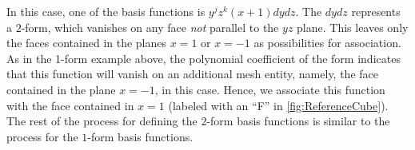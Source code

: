 \documentclass[format=acmsmall,screen,timestamp=false,a4paper]{acmart}
\newcommand\justin[1]{\textbf{\textcolor[rgb]{0,1,0.5}{[Justin: #1]}}}
\newcommand\lm[1]{\textbf{\textcolor[rgb]{1,0,0.5}{[Lawrence: #1]}}}
\begin{document}
\noindent In this case, one of the basis functions is $y^jz^k(x+1)dydz$.  The $dydz$ represents a $2$-form, which vanishes on any face \textit{not} parallel to the $yz$ plane.  This leaves only the faces contained in the planes $x=1$ or $x=-1$ as possibilities for association. 
As in the 1-form example above, the polynomial coefficient of the form indicates that this function will vanish on an additional mesh entity, namely, the face contained in the plane $x=-1$, in this case.
Hence, we associate this function with the face contained in $x=1$ (labeled with an ``F'' in \cref{fig:ReferenceCube}).  The rest of the process for defining the $2$-form basis functions is similar to the process for the $1$-form basis functions.

\end{document}
